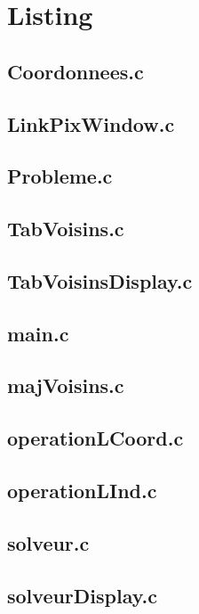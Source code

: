 \chapter{Listing}
\section{Coordonnees.c}

\section{LinkPixWindow.c}

\section{Probleme.c}

\section{TabVoisins.c}

\section{TabVoisinsDisplay.c}

\section{main.c}

\section{majVoisins.c}

\section{operationLCoord.c}

\section{operationLInd.c}

\section{solveur.c}

\section{solveurDisplay.c}

